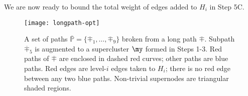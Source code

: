 We are now ready to bound the total weight of edges added to $H_i$ in Step 5C.

	\begin{figure}[hbt]
	\centering
	\texttt{[image: longpath-opt]}
	\caption{\footnotesize{A set of paths $\overline{\mathbb{P}} = \{\overline{\mp}_1,\ldots,\overline{\mp}_9\}$ broken from a long path $\overline{\mp}$. Subpath $\overline{\mp}_5$ is augmented to a supercluster $\my$ formed in Steps 1-3. Red paths of $\overline{\mp}$ are enclosed in dashed red curves; other paths are blue paths.   Red edges are level-$i$ edges taken to $H_i$; there is no red edge between any two blue paths. Non-trivial supernodes are triangular shaded regions. }}
	\label{fig:longpath-opt}
\end{figure}

